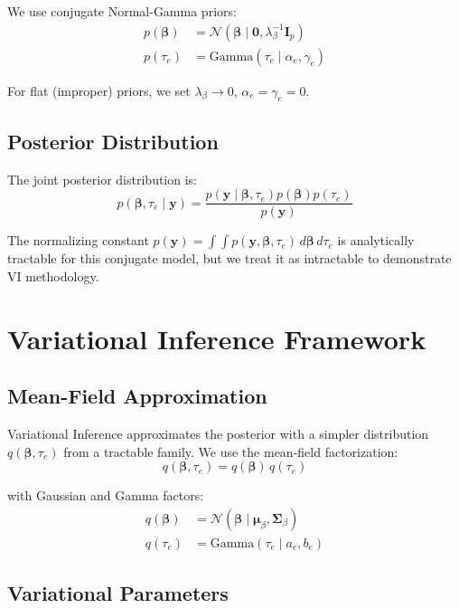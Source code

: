 \documentclass[11pt]{article}
\newcommand{\N}{\mathcal{N}}
\begin{document}
We use conjugate Normal-Gamma priors:
\begin{align}
p(\bm{\beta}) &= \N(\bm{\beta} \mid \bm{0}, \lambda_\beta^{-1} \bm{I}_p) \label{eq:prior_beta}\\
p(\tau_e) &= \text{Gamma}(\tau_e \mid \alpha_e, \gamma_e) \label{eq:prior_tau}
\end{align}

For flat (improper) priors, we set $\lambda_\beta \to 0$, $\alpha_e = \gamma_e = 0$.

\subsection{Posterior Distribution}

The joint posterior distribution is:
\begin{equation}
p(\bm{\beta}, \tau_e \mid \bm{y}) = \frac{p(\bm{y} \mid \bm{\beta}, \tau_e) p(\bm{\beta}) p(\tau_e)}{p(\bm{y})}
\end{equation}

The normalizing constant $p(\bm{y}) = \int \int p(\bm{y}, \bm{\beta}, \tau_e) \, d\bm{\beta} \, d\tau_e$ is analytically tractable for this conjugate model, but we treat it as intractable to demonstrate VI methodology.

\section{Variational Inference Framework}

\subsection{Mean-Field Approximation}

Variational Inference approximates the posterior with a simpler distribution $q(\bm{\beta}, \tau_e)$ from a tractable family. We use the mean-field factorization:
\begin{equation}
q(\bm{\beta}, \tau_e) = q(\bm{\beta}) \, q(\tau_e)
\end{equation}

with Gaussian and Gamma factors:
\begin{align}
q(\bm{\beta}) &= \N(\bm{\beta} \mid \bm{\mu}_\beta, \bm{\Sigma}_\beta) \label{eq:q_beta}\\
q(\tau_e) &= \text{Gamma}(\tau_e \mid a_e, b_e) \label{eq:q_tau}
\end{align}

\subsection{Variational Parameters}
\end{document}
